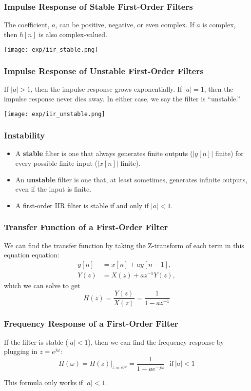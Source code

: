 \documentclass{beamer}
\begin{document}
\begin{frame}
  \frametitle{Impulse Response of Stable First-Order Filters}

  The coefficient, $a$, can be positive, negative, or even complex.
  If $a$ is complex, then $h[n]$ is also complex-valued.
  \centerline{\texttt{[image: exp/iir\_stable.png]}}

\end{frame}

\begin{frame}
  \frametitle{Impulse Response of Unstable First-Order Filters}

  If $|a|>1$, then the impulse response grows exponentially.  If
  $|a|=1$, then the impulse response never dies away.  In either case,
  we say the filter is ``unstable.''
  \centerline{\texttt{[image: exp/iir\_unstable.png]}}

\end{frame}

\begin{frame}
  \frametitle{Instability}

  \begin{itemize}
  \item A {\bf stable} filter is one that always generates finite
    outputs ($|y[n]|$ finite) for every possible finite input
    ($|x[n]|$ finite).
  \item An {\bf unstable} filter is one that, at least sometimes,
    generates infinite outputs, even if the input is finite.
  \item A first-order IIR filter is stable if and only if $|a|<1$.
  \end{itemize}
\end{frame}


\begin{frame}
  \frametitle{Transfer Function of a First-Order Filter}

  We can find the transfer function by taking the Z-transform of each
  term in this equation equation:
  \begin{align*}
  y[n] &= x[n] + ay[n-1],\\
  Y(z) &= X(z)+az^{-1} Y(z),
  \end{align*}
  which we can solve to get
  \[
  H(z)  = \frac{Y(z)}{X(z)} = \frac{1}{1-az^{-1}}
  \]
\end{frame}

\begin{frame}
  \frametitle{Frequency Response of a  First-Order Filter}

  If the filter is stable ($|a|<1$), then 
  we can find the frequency response by plugging in $z=e^{j\omega}$:
  \[
  H(\omega) = H(z)\vert_{z=e^{j\omega}}  =  \frac{1}{1-ae^{-j\omega}}~~~\mbox{if}~|a|<1
  \]

  This formula only works if $|a|<1$.
\end{frame}
\end{document}
